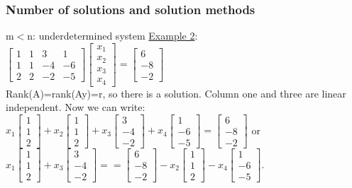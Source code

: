 \begin{frame}
	\frametitle{Number of solutions and solution methods}
	\begin{block}{m$<$n: underdetermined system}
		\underline{Example 2}:\\
		$\begin{bmatrix}
		1 & 1 & 3 & 1\\
		1 & 1 & -4 & -6\\
		2 & 2 & -2 & -5
		\end{bmatrix}\begin{bmatrix}
		x_1\\x_2\\x_3\\x_4
		\end{bmatrix}=\begin{bmatrix}
		6\\-8\\-2
		\end{bmatrix}$\\
		Rank(A)=rank(Ay)=r, so there is a solution. Column one and three are linear independent. Now we can write:\
		$x_1\begin{bmatrix}
		1\\1\\2
		\end{bmatrix}+ x_2\begin{bmatrix}
		1\\1\\2 \end{bmatrix}+x_3\begin{bmatrix}
		3\\-4\\-2
		\end{bmatrix}+x_4\begin{bmatrix}
		1\\-6\\-5
		\end{bmatrix}=\begin{bmatrix}
		6\\-8\\-2
		\end{bmatrix}$ or \\
		$x_1\begin{bmatrix}
		1\\1\\2
		\end{bmatrix}+x_3\begin{bmatrix}
			3\\-4\\-2
		\end{bmatrix}==\begin{bmatrix}
		6\\-8\\-2
		\end{bmatrix}- x_2\begin{bmatrix}
		1\\1\\2 \end{bmatrix}-x_4\begin{bmatrix}
		1\\-6\\-5
		\end{bmatrix}$.
	\end{block}
\end{frame}

